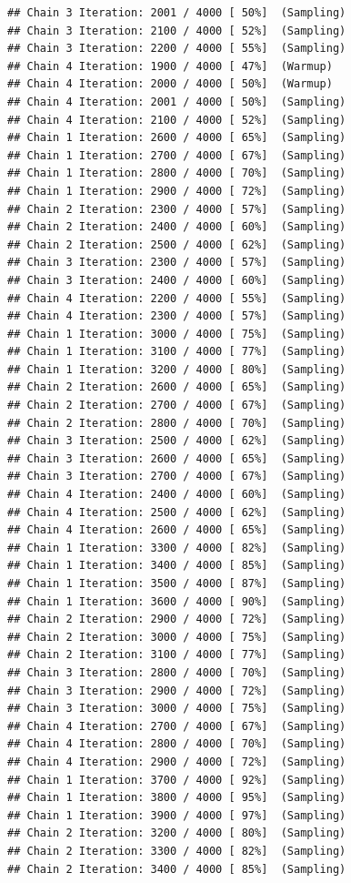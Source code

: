 \documentclass[
]{article}
\begin{document}
\begin{verbatim}
## Chain 3 Iteration: 2001 / 4000 [ 50%]  (Sampling) 
## Chain 3 Iteration: 2100 / 4000 [ 52%]  (Sampling) 
## Chain 3 Iteration: 2200 / 4000 [ 55%]  (Sampling) 
## Chain 4 Iteration: 1900 / 4000 [ 47%]  (Warmup) 
## Chain 4 Iteration: 2000 / 4000 [ 50%]  (Warmup) 
## Chain 4 Iteration: 2001 / 4000 [ 50%]  (Sampling) 
## Chain 4 Iteration: 2100 / 4000 [ 52%]  (Sampling) 
## Chain 1 Iteration: 2600 / 4000 [ 65%]  (Sampling) 
## Chain 1 Iteration: 2700 / 4000 [ 67%]  (Sampling) 
## Chain 1 Iteration: 2800 / 4000 [ 70%]  (Sampling) 
## Chain 1 Iteration: 2900 / 4000 [ 72%]  (Sampling) 
## Chain 2 Iteration: 2300 / 4000 [ 57%]  (Sampling) 
## Chain 2 Iteration: 2400 / 4000 [ 60%]  (Sampling) 
## Chain 2 Iteration: 2500 / 4000 [ 62%]  (Sampling) 
## Chain 3 Iteration: 2300 / 4000 [ 57%]  (Sampling) 
## Chain 3 Iteration: 2400 / 4000 [ 60%]  (Sampling) 
## Chain 4 Iteration: 2200 / 4000 [ 55%]  (Sampling) 
## Chain 4 Iteration: 2300 / 4000 [ 57%]  (Sampling) 
## Chain 1 Iteration: 3000 / 4000 [ 75%]  (Sampling) 
## Chain 1 Iteration: 3100 / 4000 [ 77%]  (Sampling) 
## Chain 1 Iteration: 3200 / 4000 [ 80%]  (Sampling) 
## Chain 2 Iteration: 2600 / 4000 [ 65%]  (Sampling) 
## Chain 2 Iteration: 2700 / 4000 [ 67%]  (Sampling) 
## Chain 2 Iteration: 2800 / 4000 [ 70%]  (Sampling) 
## Chain 3 Iteration: 2500 / 4000 [ 62%]  (Sampling) 
## Chain 3 Iteration: 2600 / 4000 [ 65%]  (Sampling) 
## Chain 3 Iteration: 2700 / 4000 [ 67%]  (Sampling) 
## Chain 4 Iteration: 2400 / 4000 [ 60%]  (Sampling) 
## Chain 4 Iteration: 2500 / 4000 [ 62%]  (Sampling) 
## Chain 4 Iteration: 2600 / 4000 [ 65%]  (Sampling) 
## Chain 1 Iteration: 3300 / 4000 [ 82%]  (Sampling) 
## Chain 1 Iteration: 3400 / 4000 [ 85%]  (Sampling) 
## Chain 1 Iteration: 3500 / 4000 [ 87%]  (Sampling) 
## Chain 1 Iteration: 3600 / 4000 [ 90%]  (Sampling) 
## Chain 2 Iteration: 2900 / 4000 [ 72%]  (Sampling) 
## Chain 2 Iteration: 3000 / 4000 [ 75%]  (Sampling) 
## Chain 2 Iteration: 3100 / 4000 [ 77%]  (Sampling) 
## Chain 3 Iteration: 2800 / 4000 [ 70%]  (Sampling) 
## Chain 3 Iteration: 2900 / 4000 [ 72%]  (Sampling) 
## Chain 3 Iteration: 3000 / 4000 [ 75%]  (Sampling) 
## Chain 4 Iteration: 2700 / 4000 [ 67%]  (Sampling) 
## Chain 4 Iteration: 2800 / 4000 [ 70%]  (Sampling) 
## Chain 4 Iteration: 2900 / 4000 [ 72%]  (Sampling) 
## Chain 1 Iteration: 3700 / 4000 [ 92%]  (Sampling) 
## Chain 1 Iteration: 3800 / 4000 [ 95%]  (Sampling) 
## Chain 1 Iteration: 3900 / 4000 [ 97%]  (Sampling) 
## Chain 2 Iteration: 3200 / 4000 [ 80%]  (Sampling) 
## Chain 2 Iteration: 3300 / 4000 [ 82%]  (Sampling) 
## Chain 2 Iteration: 3400 / 4000 [ 85%]  (Sampling) 

\end{verbatim}
\end{document}
